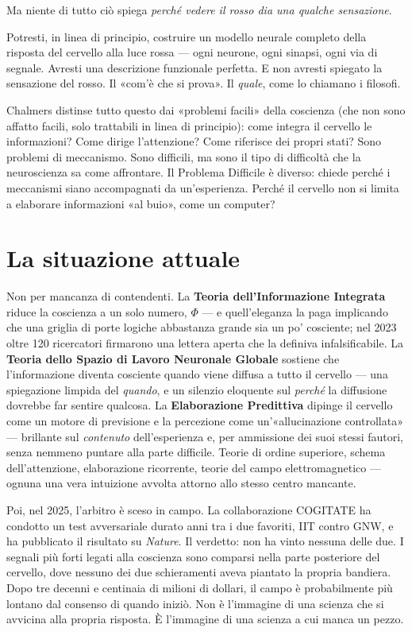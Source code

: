 \documentclass[11pt, twoside, openright]{book}
\begin{document}
Ma niente di tutto ciò spiega \textit{perché vedere il rosso dia una qualche sensazione}.

Potresti, in linea di principio, costruire un modello neurale completo della risposta del cervello alla luce rossa --- ogni neurone, ogni sinapsi, ogni via di segnale. Avresti una descrizione funzionale perfetta. E non avresti spiegato la sensazione del rosso. Il «com'è che si prova». Il \textit{quale}, come lo chiamano i filosofi.

Chalmers distinse tutto questo dai «problemi facili» della coscienza (che non sono affatto facili, solo trattabili in linea di principio): come integra il cervello le informazioni? Come dirige l'attenzione? Come riferisce dei propri stati? Sono problemi di meccanismo. Sono difficili, ma sono il tipo di difficoltà che la neuroscienza sa come affrontare. Il Problema Difficile è diverso: chiede perché i meccanismi siano accompagnati da un'esperienza. Perché il cervello non si limita a elaborare informazioni «al buio», come un computer?

\section*{La situazione attuale}

Non per mancanza di contendenti. La \textbf{Teoria dell'Informazione Integrata} riduce la coscienza a un solo numero, $\Phi$ --- e quell'eleganza la paga implicando che una griglia di porte logiche abbastanza grande sia un po' cosciente; nel 2023 oltre 120 ricercatori firmarono una lettera aperta che la definiva infalsificabile. La \textbf{Teoria dello Spazio di Lavoro Neuronale Globale} sostiene che l'informazione diventa cosciente quando viene diffusa a tutto il cervello --- una spiegazione limpida del \textit{quando}, e un silenzio eloquente sul \textit{perché} la diffusione dovrebbe far sentire qualcosa. La \textbf{Elaborazione Predittiva} dipinge il cervello come un motore di previsione e la percezione come un'«allucinazione controllata» --- brillante sul \textit{contenuto} dell'esperienza e, per ammissione dei suoi stessi fautori, senza nemmeno puntare alla parte difficile. Teorie di ordine superiore, schema dell'attenzione, elaborazione ricorrente, teorie del campo elettromagnetico --- ognuna una vera intuizione avvolta attorno allo stesso centro mancante.

Poi, nel 2025, l'arbitro è sceso in campo. La collaborazione COGITATE ha condotto un test avversariale durato anni tra i due favoriti, IIT contro GNW, e ha pubblicato il risultato su \textit{Nature}. Il verdetto: non ha vinto nessuna delle due. I segnali più forti legati alla coscienza sono comparsi nella parte posteriore del cervello, dove nessuno dei due schieramenti aveva piantato la propria bandiera. Dopo tre decenni e centinaia di milioni di dollari, il campo è probabilmente più lontano dal consenso di quando iniziò. Non è l'immagine di una scienza che si avvicina alla propria risposta. È l'immagine di una scienza a cui manca un pezzo.
\end{document}
